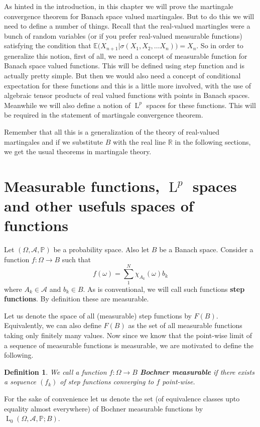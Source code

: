 \documentclass[]{report}
\newcommand{\lp}[2]{\operatorname{L}_{#1}({#2})}
\newcommand*{\ext}[1]{\mathbb{E}\big({#1}\big)}
\newcommand{\pspc}{\Omega,\mathcal{A},\mathbb{P}}
\newtheorem{Def}[theorem]{Definition}
\begin{document}
As hinted in the introduction, in this chapter we will prove the martingale convergence theorem for Banach space valued martingales. But to do this we will need to define a number of things. Recall that the real-valued martingles were a bunch of random variables (or if you prefer real-valued measurable functions) satisfying the condition that $\ext{X_{n+1}|\sigma(X_1,X_2, \ldots X_n)}=X_n$. So in order to generalize this notion, first of all, we need a concept of measurable function for Banach space valued functions. This will be defined using step function and is actually pretty simple. But then we would also need a concept of conditional expectation for these functions and this is a little more involved, with the use of algebraic tensor products of real valued functions with points in Banach spaces. Meanwhile we will also define a notion of $\operatorname{L}^{p}$ spaces for these functions. This will be required in the statement of martingale convergence theorem.

Remember that all this is a generalization of the theory of real-valued martingales and if we substitute $B$ with the real line $\mathbb{R}$ in the following sections, we get the usual theorems in martingale theory.

\section{Measurable functions, $\operatorname{L}^{p}$ spaces and other usefuls spaces of functions}
Let $(\pspc)$ be a probability space. Also let $B$ be a Banach space. Consider a function $f: \Omega \rightarrow B$ such that 
\[ f(\omega) = \sum_{1}^{N} \chi_{A_k}(\omega)b_k \]
where $A_k \in \mathcal{A}$ and $b_k\in B$. As is conventional, we will call such functions \textbf{step functions}. By definition these are measurable. 

Let us denote the space of all (measurable) step functions by $F(B)$. Equivalently, we can also define $F(B)$ as the set of all measurable functions taking only finitely many values. Now since we know that the point-wise limit of a sequence of measurable functions is measurable, we are motivated to define the following.

\begin{Def}
	We call a function $f: \Omega \rightarrow B$ \textbf{Bochner measurable} if there exists a sequence $(f_k)$ of step functions converging to $f$ point-wise.
\end{Def}

For the sake of convenience let us denote the set (of equivalence classes upto equality almost everywhere) of Bochner measurable functions by $\lp{0}{\pspc; B}$. 
\end{document}
